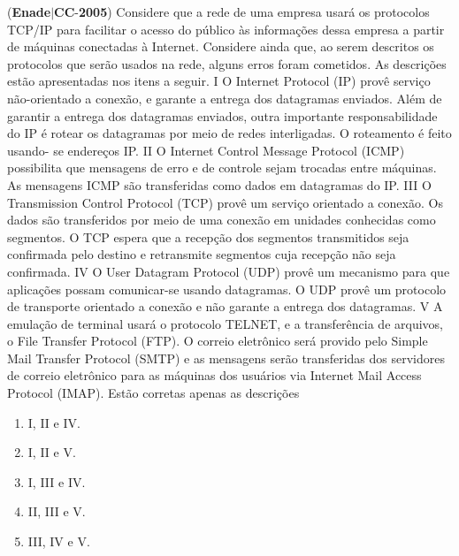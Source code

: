 \documentclass{exam}
\begin{document}
\begin{questions}
\question (\textbf{Enade}$|$\textbf{CC}-\textbf{2005}) Considere que a rede de uma empresa usará os protocolos
TCP/IP para facilitar o acesso do público às informações dessa
empresa a partir de máquinas conectadas à Internet. Considere
ainda que, ao serem descritos os protocolos que serão usados na
rede, alguns erros foram cometidos. As descrições estão
apresentadas nos itens a seguir.
I O Internet Protocol (IP) provê serviço não-orientado a
conexão, e garante a entrega dos datagramas enviados. Além
de garantir a entrega dos datagramas enviados, outra
importante responsabilidade do IP é rotear os datagramas
por meio de redes interligadas. O roteamento é feito usando-
se endereços IP.
II O Internet Control Message Protocol (ICMP) possibilita
que mensagens de erro e de controle sejam trocadas entre
máquinas. As mensagens ICMP são transferidas como dados
em datagramas do IP.
III O Transmission Control Protocol (TCP) provê um serviço
orientado a conexão. Os dados são transferidos por meio de
uma conexão em unidades conhecidas como segmentos.
O TCP espera que a recepção dos segmentos transmitidos
seja confirmada pelo destino e retransmite segmentos cuja
recepção não seja confirmada.
IV O User Datagram Protocol (UDP) provê um mecanismo
para que aplicações possam comunicar-se usando
datagramas. O UDP provê um protocolo de transporte
orientado a conexão e não garante a entrega dos datagramas.
V A emulação de terminal usará o protocolo TELNET, e a
transferência de arquivos, o File Transfer Protocol (FTP).
O correio eletrônico será provido pelo Simple Mail Transfer
Protocol (SMTP) e as mensagens serão transferidas dos
servidores de correio eletrônico para as máquinas dos
usuários via Internet Mail Access Protocol (IMAP).
Estão corretas apenas as descrições
	\begin{enumerate}[label=\alph*)]
		\item  I, II e IV. 
		\item  I, II e V. 
		\item  I, III e IV.
		\item  II, III e V.
		\item  III, IV e V.

	\end{enumerate}


\end{questions}
\end{document}
